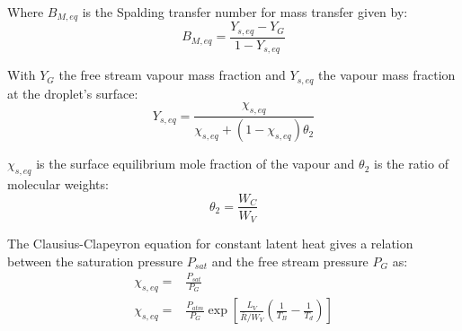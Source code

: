 \documentclass[../Interim_Report_Master]{subfiles}
\begin{document}
Where $B_{M,eq}$ is the Spalding transfer number for mass transfer given by:
\begin{equation}
B_{M,eq} = \frac{Y_{s,eq}-Y_G}{1-Y_{s,eq}}
\end{equation}

With $Y_G$ the free stream vapour mass fraction and $Y_{s,eq}$ the vapour mass fraction at the droplet's surface:
\begin{equation}
Y_{s,eq} = \frac{\chi_{s,eq}}{\chi_{s,eq}+(1-\chi_{s,eq})\theta_2}
\end{equation}

$\chi_{s,eq}$ is the surface equilibrium mole fraction of the vapour and $\theta_2$ is the ratio of molecular weights:
\begin{equation}
\theta_2=\frac{W_C}{W_V}
\end{equation}

The Clausius-Clapeyron equation for constant latent heat gives a relation between the saturation pressure $P_{sat}$ and the free stream pressure $P_G$ as:
\begin{subequations}
	\begin{align}
	\chi_{s,eq} =& \frac{P_{sat}}{P_G} \\
	\chi_{s,eq} =& \frac{P_{atm}}{P_G}\exp \left[\frac{L_V}{\bar{R}/W_V}\left(\frac{1}{T_B}-\frac{1}{T_d}\right)\right] 
	\end{align}
\end{subequations}
\end{document}
